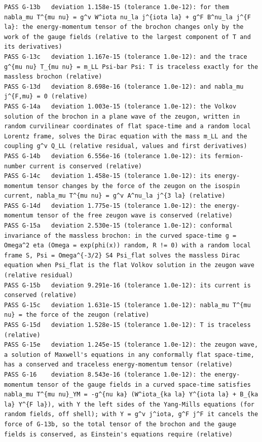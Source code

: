 \documentclass[
  10pt,
]{article}
\begin{document}
\begin{verbatim}
PASS G-13b   deviation 1.158e-15 (tolerance 1.0e-12): for them nabla_mu T^{mu nu} = g^v W^iota nu_la j^{iota la} + g^F B^nu_la j^{F la}: the energy-momentum tensor of the brochon changes only by the work of the gauge fields (relative to the largest component of T and its derivatives)
PASS G-13c   deviation 1.167e-15 (tolerance 1.0e-12): and the trace g^{mu nu} T_{mu nu} = m_LL Psi-bar Psi: T is traceless exactly for the massless brochon (relative)
PASS G-13d   deviation 8.698e-16 (tolerance 1.0e-12): and nabla_mu j^{F,mu} = 0 (relative)
PASS G-14a   deviation 1.003e-15 (tolerance 1.0e-12): the Volkov solution of the brochon in a plane wave of the zeugon, written in random curvilinear coordinates of flat space-time and a random local Lorentz frame, solves the Dirac equation with the mass m_LL and the coupling g^v Q_LL (relative residual, values and first derivatives)
PASS G-14b   deviation 6.556e-16 (tolerance 1.0e-12): its fermion-number current is conserved (relative)
PASS G-14c   deviation 1.458e-15 (tolerance 1.0e-12): its energy-momentum tensor changes by the force of the zeugon on the isospin current, nabla_mu T^{mu nu} = g^v A^nu_la j^{3 la} (relative)
PASS G-14d   deviation 1.775e-15 (tolerance 1.0e-12): the energy-momentum tensor of the free zeugon wave is conserved (relative)
PASS G-15a   deviation 2.530e-15 (tolerance 1.0e-12): conformal invariance of the massless brochon: in the curved space-time g = Omega^2 eta (Omega = exp(phi(x)) random, R != 0) with a random local frame S, Psi = Omega^{-3/2} S4 Psi_flat solves the massless Dirac equation when Psi_flat is the flat Volkov solution in the zeugon wave (relative residual)
PASS G-15b   deviation 9.291e-16 (tolerance 1.0e-12): its current is conserved (relative)
PASS G-15c   deviation 1.631e-15 (tolerance 1.0e-12): nabla_mu T^{mu nu} = the force of the zeugon (relative)
PASS G-15d   deviation 1.528e-15 (tolerance 1.0e-12): T is traceless (relative)
PASS G-15e   deviation 1.245e-15 (tolerance 1.0e-12): the zeugon wave, a solution of Maxwell's equations in any conformally flat space-time, has a conserved and traceless energy-momentum tensor (relative)
PASS G-16    deviation 8.543e-16 (tolerance 1.0e-12): the energy-momentum tensor of the gauge fields in a curved space-time satisfies nabla_mu T^{mu nu}_YM = -g^{nu ka} (W^iota_{ka la} Y^{iota la} + B_{ka la} Y^{F la}), with Y the left sides of the Yang-Mills equations (for random fields, off shell); with Y = g^v j^iota, g^F j^F it cancels the force of G-13b, so the total tensor of the brochon and the gauge fields is conserved, as Einstein's equations require (relative)

\end{verbatim}
\end{document}

